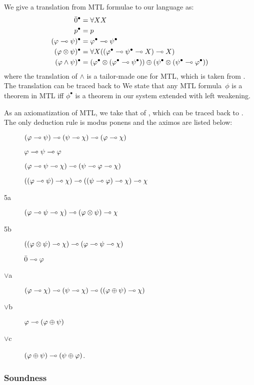 We give a translation from MTL formulae to our language as:
\begin{align*}
 \bar{0}^\bullet &= \forall XX\\
 p^\bullet &= p\\
 (\varphi\multimap\psi)^\bullet &= \varphi^\bullet \multimap \psi^\bullet\\
 (\varphi\otimes\psi)^\bullet & = \forall
 X((\varphi^\bullet\multimap\psi^\bullet\multimap X)\multimap X) \\
 (\varphi\land \psi)^\bullet &=
 (\varphi^\bullet\otimes(\varphi^\bullet\multimap\psi^\bullet))\oplus
 (\psi^\bullet \otimes(\psi^\bullet \multimap\varphi^\bullet))
\end{align*}
where the translation of $\land$ is a tailor-made one for MTL,
 which is taken from \citep[p.~48]{handbook:fuzzy}.  The translation
can be traced back to 
We state that any MTL formula~$\phi$ is a theorem in MTL iff
 $\phi^\bullet$ is a theorem in our system extended with left weakening.

As an axiomatization of MTL, we take that of \citep[p.~47]{handbook:fuzzy},
which can be traced back to .
The only deduction rule is modus ponens and the aximos are listed below:
\begin{description}
 \item[] $(\varphi\multimap\psi)\multimap(\psi\multimap\chi)\multimap(\varphi\multimap\chi)$
 \item[] $\varphi\multimap\psi\multimap\varphi$
 \item[] $(\varphi\multimap\psi\multimap\chi)\multimap(\psi\multimap\varphi\multimap\chi)$
 \item[] $((\varphi\multimap\psi)\multimap\chi)\multimap((\psi\multimap\varphi)\multimap\chi)\multimap\chi$
 \item[\MTLs 5a] $(\varphi\multimap\psi\multimap\chi)\multimap (\varphi\otimes\psi)\multimap\chi$
 \item[\MTLs 5b] $((\varphi\otimes\psi)\multimap\chi)\multimap (\varphi\multimap\psi\multimap\chi)$
 \item[]  $\bar 0\multimap\varphi$
 \item[$\vee$a] $(\varphi\multimap\chi)\multimap(\psi\multimap\chi)\multimap((\varphi\oplus\psi)\multimap\chi)$
 \item[$\vee$b] $\varphi\multimap(\varphi\oplus\psi)$
 \item[$\vee$c] $(\varphi\oplus\psi)\multimap(\psi\oplus\varphi)$.
\end{description}

\subsubsection{Soundness}

